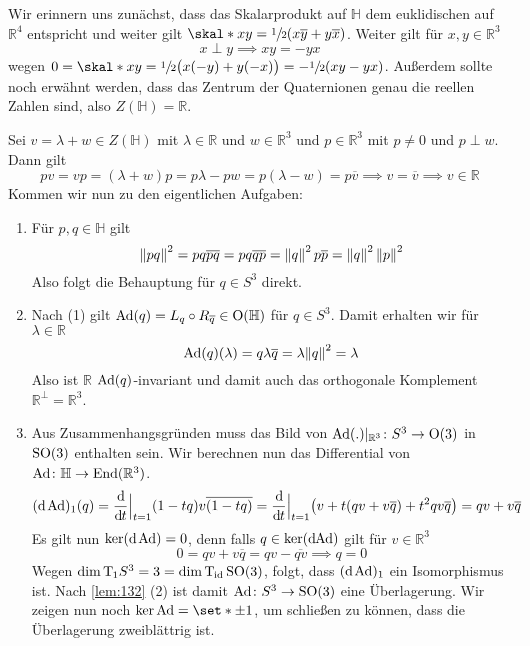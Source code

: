 \begin{beweis}
	Wir erinnern uns zunächst, dass das Skalarprodukt auf $\mathbb{H}$ dem euklidischen auf $\mathbb{R}^4$ entspricht und weiter gilt $\skal*{x}{y} = \sfrac{1}{2} (x \overline{y} + y\overline{x})$.
	Weiter gilt für $x,y \in \mathbb{R}^3$ 
	\[
		x \perp y \implies xy= -yx
	\]
	wegen $0 = \skal*{x}{y} = \sfrac{1}{2} \enbrace[\big]{x(-y) + y(-x)} = - \sfrac{1}{2} \enbrace*{xy-yx}$.
	Außerdem sollte noch erwähnt werden, dass das Zentrum der Quaternionen genau die reellen Zahlen sind, also $Z(\mathbb{H}) = \mathbb{R}$.
	
	Sei $v = \lambda + w \in Z(\mathbb{H})$ mit $\lambda \in \mathbb{R}$ und $w \in \mathbb{R}^3$ und $p \in \mathbb{R}^3$ mit $p\neq 0$ und $p \perp w$.
	Dann gilt
	\[
		pv = vp = (\lambda + w )p = p \lambda - p w = p (\lambda-w) = p \overline{v} \implies v=\overline{v} \implies v \in \mathbb{R}
	\]
	Kommen wir nun zu den eigentlichen Aufgaben:
	\begin{enumerate}[(1)]
		\item Für $p,q \in \mathbb{H}$ gilt
		\[
			\norm*{pq}^2 = pq \overline{pq} = p q \overline{q} \overline{p} = \norm*{q}^2\, p \overline{p} = \norm*{q}^2\, \norm*{p}^2
		\]
		Also folgt die Behauptung für $q \in S^3$ direkt.
		\item Nach (1) gilt $\operatorname{Ad}(q) = L_q \circ R_{\overline{q}} \in \operatorname{O}(\mathbb{H})$ für $q \in S^3$.
		Damit erhalten wir für $\lambda \in \mathbb{R}$
		\[
			\Ad(q)(\lambda) = q \lambda \overline{q} = \lambda \norm*{q}^2 = \lambda 
		\]
		Also ist $\mathbb{R}$ $\operatorname{Ad}(q)$-invariant und damit auch das orthogonale Komplement $\mathbb{R}^\bot = \mathbb{R}^3$.
		\item Aus Zusammenhangsgründen muss das Bild von $\operatorname{Ad}(.)|_{\mathbb{R}^3} \colon S^3 \to \operatorname{O}(3)$ in $\operatorname{SO}(3)$ enthalten sein.
		Wir berechnen nun das Differential von $\operatorname{Ad} \colon \mathbb{H} \to \operatorname{End}(\mathbb{R}^3)$.
		\[
			(\mathd \Ad)_1 (q)= \diffd{}{t}\Big|_{t=1} (1 -tq) v \overline{(1- tq)} = \diffd{}{t}\Big|_{t=1} \enbrace*{v + t(qv+v \overline{q}) + t^2 q v \overline{q}} = qv + v \overline{q}
		\]
		Es gilt nun $\ker (\mathrm{d}\mkern-1.0mu \operatorname{Ad}) =0 $, denn falls $q \in \ker (\mathrm{d}\mkern-1.0mu {\operatorname{Ad}})$ gilt für $v \in \mathbb{R}^3$
		\[
			0= qv + v \overline{q} = qv - \overline{qv}  \implies q=0
		\]
		Wegen $\dim \mathrm{T}\mkern-0.85mu_1 S^3 = 3 = \dim \mathrm{T}\mkern-0.85mu_{\operatorname{id}} \operatorname{SO}(3)$, folgt, dass $(\mathrm{d}\mkern-1.0mu \operatorname{Ad})_1$ ein Isomorphismus ist.
		Nach \autoref{lem:132} (2) ist damit $\operatorname{Ad} \colon S^3 \to \operatorname{SO}(3)$ eine Überlagerung.
		Wir zeigen nun noch $\ker {\Ad} = \set*{\pm 1}$, um schließen zu können, dass die Überlagerung zweiblättrig ist.
		

\end{enumerate}
\end{beweis}
